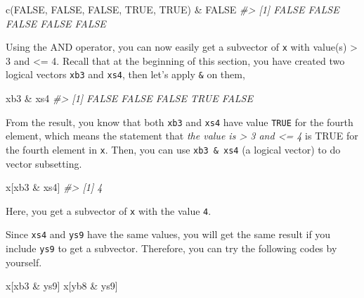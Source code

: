 \documentclass[
]{book}
\newenvironment{Shaded}{\begin{snugshade}}{\end{snugshade}}
\newcommand{\CommentTok}[1]{\textcolor[rgb]{0.56,0.35,0.01}{\textit{#1}}}
\newcommand{\ConstantTok}[1]{\textcolor[rgb]{0.00,0.00,0.00}{#1}}
\newcommand{\FunctionTok}[1]{\textcolor[rgb]{0.00,0.00,0.00}{#1}}
\newcommand{\NormalTok}[1]{#1}
\newcommand{\SpecialCharTok}[1]{\textcolor[rgb]{0.00,0.00,0.00}{#1}}
\begin{document}
\begin{Shaded}
\begin{Highlighting}[]
\FunctionTok{c}\NormalTok{(}\ConstantTok{FALSE}\NormalTok{, }\ConstantTok{FALSE}\NormalTok{, }\ConstantTok{FALSE}\NormalTok{, }\ConstantTok{TRUE}\NormalTok{, }\ConstantTok{TRUE}\NormalTok{) }\SpecialCharTok{\&} \ConstantTok{FALSE}
\CommentTok{\#\textgreater{} [1] FALSE FALSE FALSE FALSE FALSE}
\end{Highlighting}
\end{Shaded}

Using the AND operator, you can now easily get a subvector of \texttt{x} with value(s) \textgreater{} 3 and \textless= 4. Recall that at the beginning of this section, you have created two logical vectors \texttt{xb3} and \texttt{xs4}, then let's apply \texttt{\&} on them,

\begin{Shaded}
\begin{Highlighting}[]
\NormalTok{xb3 }\SpecialCharTok{\&}\NormalTok{ xs4  }
\CommentTok{\#\textgreater{} [1] FALSE FALSE FALSE  TRUE FALSE}
\end{Highlighting}
\end{Shaded}

From the result, you know that both \texttt{xb3} and \texttt{xs4} have value \texttt{TRUE} for the fourth element, which means the statement that \emph{the value is \textgreater{} 3 and \textless= 4} is TRUE for the fourth element in \texttt{x}. Then, you can use \texttt{xb3\ \&\ xs4} (a logical vector) to do vector subsetting.

\begin{Shaded}
\begin{Highlighting}[]
\NormalTok{x[xb3 }\SpecialCharTok{\&}\NormalTok{ xs4]                                      }
\CommentTok{\#\textgreater{} [1] 4}
\end{Highlighting}
\end{Shaded}

Here, you get a subvector of \texttt{x} with the value \texttt{4}.

Since \texttt{xs4} and \texttt{ys9} have the same values, you will get the same result if you include \texttt{ys9} to get a subvector. Therefore, you can try the following codes by yourself.

\begin{Shaded}
\begin{Highlighting}[]
\NormalTok{x[xb3 }\SpecialCharTok{\&}\NormalTok{ ys9]}
\NormalTok{x[yb8 }\SpecialCharTok{\&}\NormalTok{ ys9]}
\end{Highlighting}
\end{Shaded}
\end{document}
